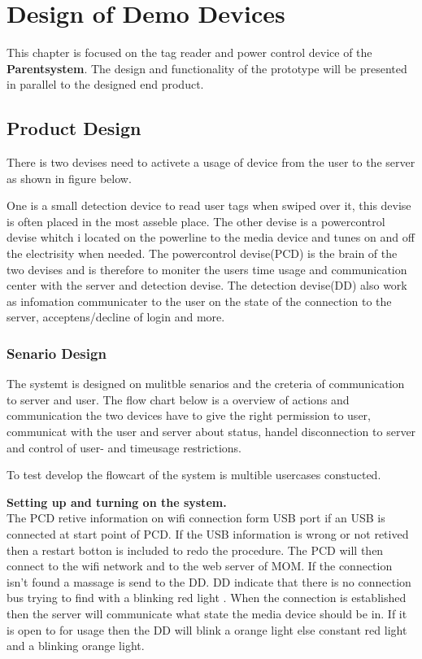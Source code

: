 \chapter{Design of Demo Devices}
This chapter is focused on the tag reader and power control device of the \textbf{Parentsystem}. 
The design and functionality of the prototype will be presented in parallel to the designed end product.

\section{Product Design}

There is two devises need to activete a usage of device from the user to the server as shown in figure below.


One is a small detection device to read user tags when swiped over it, this devise is often placed in the most asseble place. 
The other devise is a powercontrol devise whitch i located on the powerline to the media device and tunes on and off the electrisity when needed.
The powercontrol devise(PCD) is the brain of the two devises and is therefore to moniter the users time usage and communication center with the server and detection devise. 
The detection devise(DD) also work as infomation communicater to the user on the state of the connection to the server, acceptens/decline of login and more.     

\subsection{Senario Design}

The systemt is designed on mulitble senarios and the creteria of communication to server and user. The flow chart below is a overview of actions and communication the two devices have to give the right permission to user, communicat with the user and server about status, handel disconnection to server and control of user- and timeusage restrictions.


To test develop the flowcart of the system is multible usercases constucted.

\textbf{Setting up and turning on the system.} \\
The PCD retive information on wifi connection form USB port if an USB is connected at start point of PCD. 
If the USB information is wrong or not retived then a restart botton is included to redo the procedure.  
The PCD will then connect to the wifi network and to the web server of MOM. If the connection isn't found a massage is send to the DD. DD indicate that there is no connection bus trying to find with a blinking red light . When the connection is established then the server will communicate what state the media device should be in. If it is open to for usage then the DD will blink a orange light else constant red light and a blinking orange light. 

